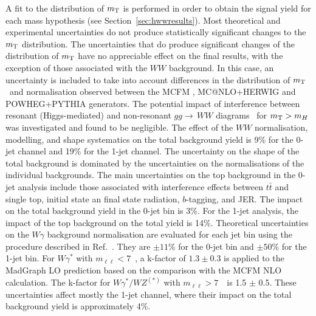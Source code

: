 \documentclass[final,3p,times,twocolumn]{elsarticle}
\newcommand{\mT}{\ensuremath{m_{\rm T}}}
\newcommand{\ZeroJet}{\mbox{0-jet}}
\newcommand{\OneJet}{\mbox{1-jet}}
\newcommand{\ggWW}{\ensuremath{gg{\rightarrow\,}WW}}
\begin{document}
A fit to the distribution of \mT{} is performed in order to obtain 
the signal yield for each mass hypothesis (see Section~\ref{sec:hwwresults}). 
Most theoretical and experimental uncertainties do not
produce statistically significant changes
to the \mT{} distribution.  The uncertainties
that do produce significant changes of the distribution of \mT{}
have no appreciable effect on the final results, with the exception 
of those associated with the $WW$ background. In this case, an uncertainty is included to take into account 
differences in the distribution of \mT\ and normalisation observed between the MCFM \cite{Campbell:2011bn}, MC@NLO+HERWIG and POWHEG+PYTHIA generators.
The potential impact of interference between resonant (Higgs-mediated) and non-resonant $\ggWW$ diagrams~\cite{Campbell:2011cu} 
for $\mT > m_H$ was investigated and found to be negligible.
The effect of the $WW$ normalisation, modelling, and shape systematics on the total background yield 
is 9\% for the \ZeroJet{} channel and 19\% for the \OneJet{} channel. 
The uncertainty on the shape of the total background is dominated by the
uncertainties on the normalisations of the individual backgrounds.
The main uncertainties on the top background in the \ZeroJet{} analysis include those associated with 
interference effects between $t\bar{t}$ and single top, initial state an final state radiation, 
$b$-tagging, and JER. The impact on the total background yield in the 0-jet bin is 3\%.  
For the \OneJet{} analysis, the impact of the top background on the total yield is 14\%. 
Theoretical uncertainties on the $W\gamma$ background normalisation are evaluated for each jet
bin using the procedure described in Ref.~\cite{Stewart:2011cf}. They are 
$\pm 11$\% for the 0-jet bin and $\pm 50$\% for the 1-jet bin. 
For $W\gamma^{\ast}$ with $m_{\ell\ell} < 7$~\GeV, a k-factor of $1.3\pm 0.3$ is applied to 
the MadGraph LO prediction based on the comparison with the MCFM NLO calculation.
The k-factor for $W\gamma^{\ast}/WZ^{(\ast)}$ with $m_{\ell\ell} > 7$~\GeV\ is 1.5 $\pm$ 0.5.
These uncertainties affect mostly the \OneJet{} channel, where their impact 
on the total background yield is approximately 4\%.



\end{document}
